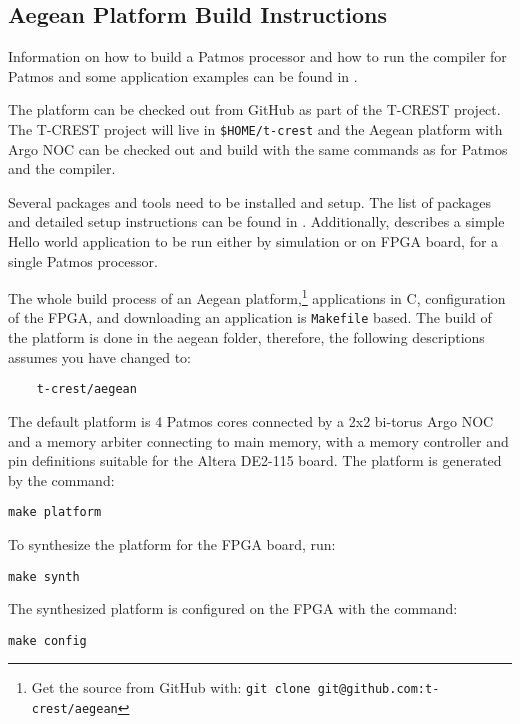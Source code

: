 \documentclass[a4paper,fontsize=10pt,twoside,DIV15,BCOR12mm,headinclude=true,footinclude=false,pagesize,bibtotoc]{scrbook}
\newcommand{\code}[1]{{\texttt{#1}}}
\begin{document}
\subsection{Aegean Platform Build Instructions}

Information on how to build a Patmos processor and how to run the compiler for Patmos and some application examples
can be found in \cite{patmos-handbook}. 

The platform can be checked out from GitHub as part of the T-CREST project.
The T-CREST project will live in \code{\$HOME/t-crest} and the Aegean platform with Argo NOC
can be checked out and build with the same commands as for Patmos and the compiler.%



Several packages and tools need to be installed and setup. The list of packages 
and detailed setup instructions can be found in \cite{patmos-handbook}.
Additionally, \cite{patmos-handbook} describes a simple Hello world application 
to be run either by simulation or on FPGA board, for a single Patmos processor.


The whole build process of an Aegean platform,\footnote{Get
the source from GitHub with: \code{git clone git@github.com:t-crest/aegean}}
applications in C, configuration of the FPGA, and downloading an
application is \code{Makefile} based. The build of the platform is
done in the aegean folder, therefore, the following descriptions
assumes you have changed to:
\begin{verbatim}
	t-crest/aegean
\end{verbatim}

The default platform is 4 Patmos cores connected by a 2x2 bi-torus
Argo NOC and a memory arbiter connecting to main memory, with a memory
controller and pin definitions suitable for the Altera DE2-115 board.
The platform is generated by the command:
\begin{verbatim}
make platform
\end{verbatim}

To synthesize the platform for the FPGA board, run:
\begin{verbatim}
make synth
\end{verbatim}

The synthesized platform is configured on the FPGA with the command:
\begin{verbatim}
make config
\end{verbatim}
\end{document}
